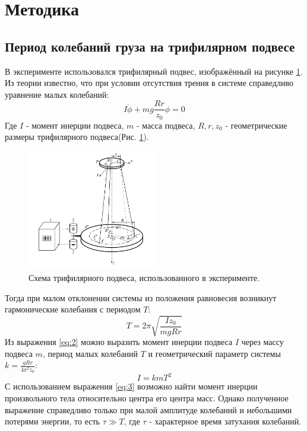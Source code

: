 \documentclass[12pt]{article}
\begin{document}
\section{Методика}
\subsection{Период колебаний груза на трифилярном подвесе}
В эксперименте использовался трифилярный подвес, изображённый на рисунке \ref{fig:1}. Из теории\cite{LabBook} известно, что при условии отсутствия
трения в системе справедливо уравнение малых колебаний:
\begin{equation}\label{eq:1}
    I\ddot{\phi} + mg\frac{Rr}{z_0}\phi = 0
\end{equation}
Где $I$ - момент инерции подвеса, $m$ - масса подвеса, $R, r, z_0$ - геометрические размеры трифилярного подвеса(Рис. \ref{fig:1}).
\begin{figure}
    \begin{center}
        \includegraphics[width=0.5\textwidth]{im.png}
    \end{center}
    \caption{Схема трифилярного подвеса, использованного в эксперименте.}
    \label{fig:1}
\end{figure}
Тогда при малом отклонении системы из положения равновесия возникнут гармонические колебания с периодом $T$:
\begin{equation}\label{eq:2}
    T = 2\pi\sqrt{\frac{Iz_0}{mgRr}}
\end{equation}
Из выражения \ref{eq:2} можно выразить момент инерции подвеса $I$ через массу подвеса $m$, период малых колебаний $T$ и геометрический параметр 
системы $k = \frac{gRr}{4\pi^2z_0}$:
\begin{equation}\label{eq:3}
    I = kmT^2
\end{equation}
С использованием выражения \ref{eq:3} возможно найти момент инерции произвольного тела относительно центра его центра масс. Однако полученное
выражение справедливо только при малой амплитуде колебаний и небольшими потерями энергии, то есть $\tau \gg T$, где $\tau$ - характерное время
затухания колебаний.
\end{document}
